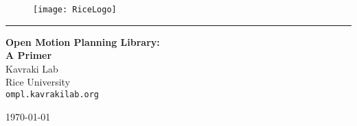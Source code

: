 \begin{titlepage}

\begin{center}



\begin {figure}
\centering
\texttt{[image: RiceLogo]}
\end{figure}
\vspace {0.25in} 
\rule{\linewidth}{0.1mm}
\vspace {0.25in}

{ \huge \bfseries Open Motion Planning Library:\\ A Primer}
\\ [0.50in]
{\Large Kavraki Lab\\
Rice University
}
\\ [0.1in]
{\tt ompl.kavrakilab.org}


\vfill

{\large \today}

\end{center}

\end{titlepage}

